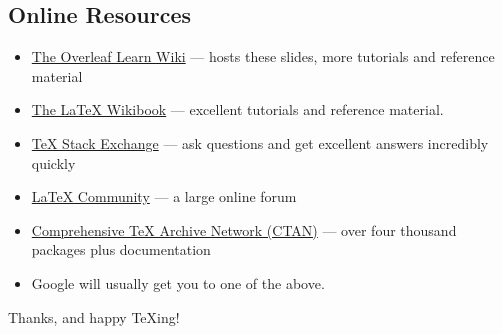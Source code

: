 \documentclass[aspectratio=169]{beamer}
\begin{document}
\subsection{Online Resources}
\begin{frame}{\insertsubsection}
\begin{itemize}
\item \href{https://www.overleaf.com/learn}{The Overleaf Learn Wiki} ---
hosts these slides, more tutorials and reference material
\item \href{http://en.wikibooks.org/wiki/LaTeX}{The \LaTeX{} Wikibook} ---
excellent tutorials and reference material.
\item \href{http://tex.stackexchange.com/}{\TeX{} Stack Exchange} --- ask
questions and get excellent answers incredibly quickly
\item \href{http://www.latex-community.org/}{\LaTeX{} Community} --- a large
online forum
\item \href{http://ctan.org/}{Comprehensive \TeX{} Archive Network (CTAN)} ---
over four thousand packages plus documentation
\item Google will usually get you to one of the above.
\end{itemize}
\end{frame}


\begin{frame}
\begin{center}
Thanks, and happy \TeX{}ing!
\end{center}
\end{frame}


\end{document}
